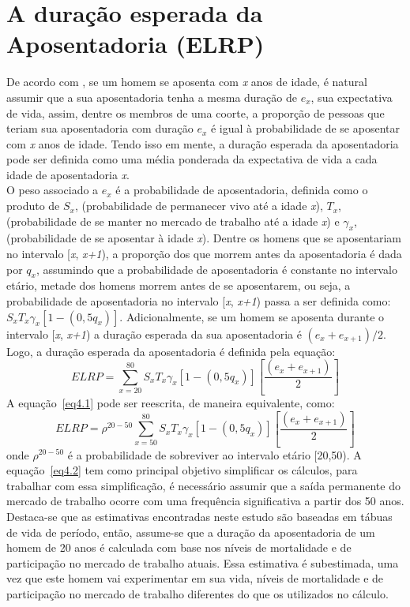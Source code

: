 \documentclass[12pt, 						%
			openright, 					%
			twoside,					%
			a4paper,x					%
			english,					%
			brazil]{abntex2}				%
\begin{document}
	\section{A duração esperada da Aposentadoria (ELRP) \label{sec3.4}}
	De acordo com , se um homem se aposenta com \emph{x} anos de idade, é natural assumir que a sua aposentadoria tenha a mesma duração de $e_{x}$, sua expectativa de vida, assim, dentre os membros de uma coorte, a proporção de pessoas que teriam sua aposentadoria com duração $e_{x}$ é igual à probabilidade de se aposentar com \emph{x} anos de idade. Tendo isso em mente, a duração esperada da aposentadoria pode ser definida como uma média ponderada da expectativa de vida a cada idade de aposentadoria \emph{x}. \\
	O peso associado a $e_{x}$ é a probabilidade de aposentadoria, definida como o produto de $S_{x}$, (probabilidade de permanecer vivo até a idade \emph{x}), $T_{x}$, (probabilidade de se manter no mercado de trabalho até a idade \emph{x}) e $\gamma_{x}$, (probabilidade de se aposentar à idade \emph{x}). Dentre os homens que se aposentariam no intervalo [\emph{x}, \emph{x+1}), a proporção dos que morrem antes da aposentadoria é dada por $q_{x}$, assumindo que a probabilidade de aposentadoria é constante no intervalo etário, metade dos homens morrem antes de se aposentarem, ou seja, a probabilidade de aposentadoria no intervalo [\emph{x}, \emph{x+1}) passa a ser definida como: $S_{x}T_{x}\gamma_{x}[1-(0,5q_x)]$. Adicionalmente, se um homem se aposenta durante o intervalo [\emph{x}, \emph{x+1})  a duração esperada da sua aposentadoria é $(e_{x}+e_{x+1})/2$. Logo, a duração esperada da aposentadoria é definida pela equação:
	\begin{equation} \label{eq4.1}
		ELRP = \sum_{x=20}^{80}S_{x}T_{x}\gamma_{x}[1-(0,5q_x)]\left[\dfrac{(e_x + e_{x+1})}{2}\right]
	\end{equation}
	A equação~\ref{eq4.1} pode ser reescrita, de maneira equivalente, como:
	\begin{equation} \label{eq4.2}
		ELRP = \rho^{20-50}\sum_{x=50}^{80}S_{x}T_{x}\gamma_{x}[1-(0,5q_x)]\left[\dfrac{(e_x + e_{x+1})}{2}\right]
	\end{equation}
onde $\rho^{20-50}$ é a probabilidade de sobreviver ao intervalo etário [20,50). A equação~\ref{eq4.2} tem como principal objetivo simplificar os cálculos, para trabalhar com essa simplificação, é necessário assumir que a saída permanente do mercado de trabalho ocorre com uma frequência significativa a partir dos 50 anos. \\
	Destaca-se que as estimativas encontradas neste estudo são baseadas em tábuas de vida de período, então, assume-se que a duração da aposentadoria de um homem de 20 anos é calculada com base nos níveis de mortalidade e de participação no mercado de trabalho atuais. Essa estimativa é subestimada, uma vez que este homem vai experimentar em sua vida, níveis de mortalidade e de participação no mercado de trabalho diferentes do que os utilizados no cálculo.
\end{document}
